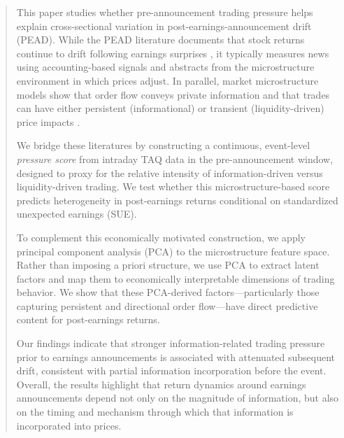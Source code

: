 \begin{abstract}
This paper studies whether pre-announcement trading pressure helps explain cross-sectional variation in post-earnings-announcement drift (PEAD). While the PEAD literature documents that stock returns continue to drift following earnings surprises \citep{BernardThomas1989}, it typically measures news using accounting-based signals and abstracts from the microstructure environment in which prices adjust. In parallel, market microstructure models show that order flow conveys private information and that trades can have either persistent (informational) or transient (liquidity-driven) price impacts \citep{Kyle1985,Hasbrouck1991}.

We bridge these literatures by constructing a continuous, event-level \emph{pressure score} from intraday TAQ data in the pre-announcement window, designed to proxy for the relative intensity of information-driven versus liquidity-driven trading. We test whether this microstructure-based score predicts heterogeneity in post-earnings returns conditional on standardized unexpected earnings (SUE).

To complement this economically motivated construction, we apply principal component analysis (PCA) to the microstructure feature space. Rather than imposing a priori structure, we use PCA to extract latent factors and map them to economically interpretable dimensions of trading behavior. We show that these PCA-derived factors—particularly those capturing persistent and directional order flow—have direct predictive content for post-earnings returns.

Our findings indicate that stronger information-related trading pressure prior to earnings announcements is associated with attenuated subsequent drift, consistent with partial information incorporation before the event. Overall, the results highlight that return dynamics around earnings announcements depend not only on the magnitude of information, but also on the timing and mechanism through which that information is incorporated into prices.
\end{abstract}
